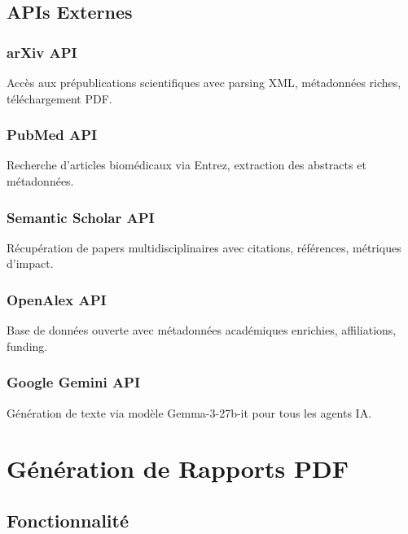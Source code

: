 \documentclass[12pt,a4paper]{article}
\begin{document}
\subsection{APIs Externes}

\subsubsection{arXiv API}
Accès aux prépublications scientifiques avec parsing XML, métadonnées riches, téléchargement PDF.

\subsubsection{PubMed API}
Recherche d'articles biomédicaux via Entrez, extraction des abstracts et métadonnées.

\subsubsection{Semantic Scholar API}
Récupération de papers multidisciplinaires avec citations, références, métriques d'impact.

\subsubsection{OpenAlex API}
Base de données ouverte avec métadonnées académiques enrichies, affiliations, funding.

\subsubsection{Google Gemini API}
Génération de texte via modèle Gemma-3-27b-it pour tous les agents IA.

\section{Génération de Rapports PDF}

\subsection{Fonctionnalité}
\end{document}
